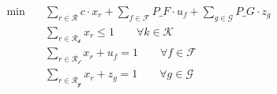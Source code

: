 \begin{align}
  \min\quad & \sum_{r \in \mathcal{R}} c \cdot x_{r} + \sum_{f \in \mathcal{F}} \mathit{P\_F} \cdot u_{f} + \sum_{g \in \mathcal{G}} \mathit{P\_G} \cdot z_{g} \tag{objective} \\
  & \sum_{r \in \mathcal{R_k}} x_{r} \le 1 \qquad \forall k \in \mathcal{K} \tag{crew\_at\_most\_one\_roster} \\
  & \sum_{r \in \mathcal{R_f}} x_{r} + u_{f} = 1 \qquad \forall f \in \mathcal{F} \tag{flight\_cover} \\
  & \sum_{r \in \mathcal{R_g}} x_{r} + z_{g} = 1 \qquad \forall g \in \mathcal{G} \tag{ground\_duty\_cover} \\
\end{align}
